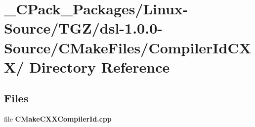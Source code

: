 \section{\_\-CPack\_\-Packages/Linux-\/Source/TGZ/dsl-\/1.0.0-\/Source/CMakeFiles/CompilerIdCXX/ Directory Reference}
\label{dir_f7fb0c0c8547297c489ad70aa98c3b86}
\subsection*{Files}
\begin{DoxyCompactItemize}
\item 
file {\bf CMakeCXXCompilerId.cpp}
\end{DoxyCompactItemize}
